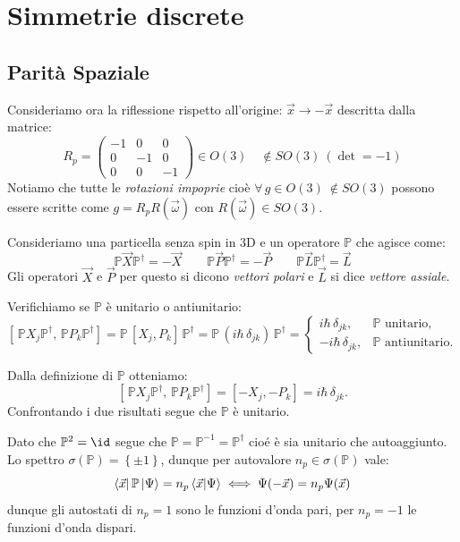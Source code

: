 \section{Simmetrie discrete}
\subsection{Parità Spaziale}
Consideriamo ora la riflessione rispetto all'origine: \(\vec{x}\to -\vec{x}\) descritta dalla matrice:
\[
    R_p = \begin{pmatrix}
        -1&0&0\\0&-1&0\\0&0&-1
    \end{pmatrix}
    \in O(3) \quad \notin SO(3) \ (\det = -1)
\]
Notiamo che tutte le \textit{rotazioni impoprie} cioè \(\forall\, g \in O(3) \ \notin SO(3)\) possono essere scritte come \(g = R_pR(\vec{\omega})\) con \(R(\vec{\omega})\in SO(3)\).

Consideriamo una particella senza spin in 3D e un operatore \(\mathbb{P}\) che agisce come:
\[
    \mathbb{P}\vec{X}\mathbb{P}^\dagger = -\vec{X} \qquad \mathbb{P}\vec{P}\mathbb{P}^\dagger = -\vec{P} \qquad \mathbb{P}\vec{L}\mathbb{P}^\dagger = \vec{L}  
\]
Gli operatori \(\vec{X}\) e \(\vec{P}\) per questo si dicono \textit{vettori polari} e \(\vec{L}\) si dice \textit{vettore assiale}.


Verifichiamo se \(\mathbb{P}\) è unitario o antiunitario:
\begin{equation*}
\left[ \, \mathbb{P} X_j \mathbb{P}^\dagger ,\, \mathbb{P} P_k \mathbb{P}^\dagger \right]
= \mathbb{P}\,[X_j,P_k] \,\mathbb{P}^\dagger
= \mathbb{P}\,(i\hbar\,\delta_{jk})\,\mathbb{P}^\dagger 
= \begin{cases}
 i\hbar\,\delta_{jk}, & \mathbb{P} \text{ unitario},\\
 -i\hbar\,\delta_{jk}, & \mathbb{P} \text{ antiunitario}.
 \end{cases}
\end{equation*}

Dalla definizione di \(\mathbb{P}\) otteniamo:
\[
\left[ \, \mathbb{P} X_j \mathbb{P}^\dagger ,\, \mathbb{P} P_k \mathbb{P}^\dagger \right]
= [-X_j,-P_k] = i\hbar\,\delta_{jk}.
\]
Confrontando i due risultati segue che \(\mathbb{P}\) è unitario.

Dato che \(\mathbb{P}^2 = \id\) segue che \(\mathbb{P}= \mathbb{P}^{-1}= \mathbb{P}^\dagger\) cioé è sia unitario che autoaggiunto.\\
Lo spettro \(\sigma(\mathbb{P})= \left\{ \pm 1   \right\}\), dunque per autovalore \(n_p \in \sigma(\mathbb{P})\) vale:
\[
    \bra{\vec{x}}\mathbb{P}\ket{\Psi}= n_p\braket{\vec{x}}{\Psi} \iff \Psi(-\vec{x}) = n_p \Psi(\vec{x})
\]
dunque gli autostati di \(n_p=1\) sono le funzioni d'onda pari, per \(n_p= -1\) le funzioni d'onda dispari.

